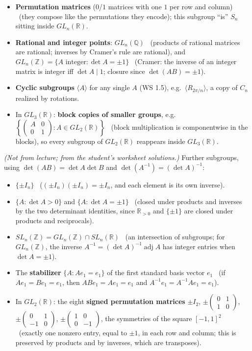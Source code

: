 \documentclass[11pt]{report}
\begin{document}
\begin{exbox}
\begin{itemize}[nosep]
    \item \textbf{Permutation matrices} ($0$/$1$ matrices with one $1$ per row and column) \ (they compose like the permutations they encode); this subgroup ``is'' $S_n$ sitting inside $GL_n(\mathbb{R})$.
    \item \textbf{Rational and integer points}: $GL_n(\mathbb{Q})$ \ (products of rational matrices are rational; inverses by Cramer's rule are rational), and $GL_n(\mathbb{Z}) = \{A \text{ integer}: \det A = \pm 1\}$ \ (Cramer: the inverse of an integer matrix is integer iff $\det A \mid 1$; closure since $\det(AB) = \pm 1$).
    \item \textbf{Cyclic subgroups} $\langle A \rangle$ for any single $A$ (WS 1.5), e.g.\ $\langle R_{2\pi/n} \rangle$, a copy of $C_n$ realized by rotations.
    \item In $GL_3(\mathbb{R})$: \textbf{block copies of smaller groups}, e.g.\ $\left\{ \begin{pmatrix} A & 0 \\ 0 & 1 \end{pmatrix} : A \in GL_2(\mathbb{R}) \right\}$ \ (block multiplication is componentwise in the blocks), so every subgroup of $GL_2(\mathbb{R})$ reappears inside $GL_3(\mathbb{R})$.
\end{itemize}
\textit{(Not from lecture; from the student's worksheet solutions.)} Further subgroups, using $\det(AB) = \det A \det B$ and $\det(A^{-1}) = (\det A)^{-1}$:
\begin{itemize}[nosep]
    \item $\{\pm I_n\}$ \ ($(\pm I_n)(\pm I_n) = \pm I_n$, and each element is its own inverse).
    \item $\{A : \det A > 0\}$ and $\{A : \det A = \pm 1\}$ \ (closed under products and inverses by the two determinant identities, since $\mathbb{R}_{>0}$ and $\{\pm 1\}$ are closed under products and reciprocals).
    \item $SL_n(\mathbb{Z}) = GL_n(\mathbb{Z}) \cap SL_n(\mathbb{R})$ \ (an intersection of subgroups; for $GL_n(\mathbb{Z})$, the inverse $A^{-1} = (\det A)^{-1} \operatorname{adj} A$ has integer entries when $\det A = \pm 1$).
    \item The \textbf{stabilizer} $\{A : A e_1 = e_1\}$ of the first standard basis vector $e_1$ \ (if $A e_1 = B e_1 = e_1$, then $AB e_1 = A e_1 = e_1$ and $A^{-1} e_1 = A^{-1} A e_1 = e_1$).
    \item In $GL_2(\mathbb{R})$: the eight \textbf{signed permutation matrices} $\pm I_2$, $\pm\begin{pmatrix} 0 & 1 \\ 1 & 0 \end{pmatrix}$, $\pm\begin{pmatrix} 0 & 1 \\ -1 & 0 \end{pmatrix}$, $\pm\begin{pmatrix} 1 & 0 \\ 0 & -1 \end{pmatrix}$, the symmetries of the square $[-1, 1]^2$ \ (exactly one nonzero entry, equal to $\pm 1$, in each row and column; this is preserved by products and by inverses, which are transposes).

\end{itemize}
\end{exbox}
\end{document}
